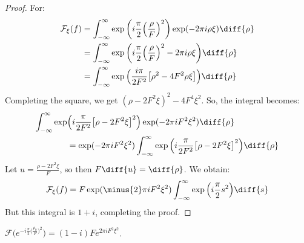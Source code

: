         \begin{proof}
        For:
        \begin{align}
            \mathcal{F}_{\xi}(f)
            &=\int_{-\infty}^{\infty}
                \exp\bigg(
                    i\frac{\pi}{2}
                    \Big(\frac{\rho}{F}\Big)^{2}
                \bigg)
                \exp(-2\pi{i}\rho\xi)\diff{\rho}\\
            &=\int_{-\infty}^{\infty}
                \exp\bigg(
                    i\frac{\pi}{2}\Big(
                        \frac{\rho}{F}
                    \Big)^{2}-2\pi{i}\rho\xi
                \bigg)
                \diff{\rho}\\
            &=\int_{-\infty}^{\infty}
                \exp\Big(
                    \frac{i\pi}{2F^2}
                    \big[\rho^2-4F^2\rho \xi\big]
                \Big)\diff{\rho}
        \end{align}
        Completing the square, we get
        $(\rho-2F^{2}\xi)^{2}-4F^{4}\xi^{2}$.
        So, the integral becomes:
        \begin{equation}
            \begin{split}
                \int_{-\infty}^{\infty}
                \exp&\Big(
                    i\frac{\pi}{2F^2}
                    \big[\rho-2F^{2}\xi\big]^{2}
                \Big)
                \exp(-2\pi{i}F^{2}\xi^{2})\diff{\rho}\\
                &=\exp(-2\pi{i}F^{2}\xi^{2})
                \int_{-\infty}^{\infty}
                \exp\Big(
                    i\frac{\pi}{2F^2}
                    \big[\rho-2F^{2}\xi\big]^{2}
                \Big)\diff{\rho}
            \end{split}
        \end{equation}
        Let $u=\frac{\rho-2F^{2}\xi}{F}$, so then
        $F\diff{u}=\diff{\rho}$. We obtain:
        \begin{equation}
            \mathcal{F}_{\xi}(f)
            =F\exp(\minus{2}\pi{i}F^{2}\xi^{2})
                \int_{-\infty}^{\infty}
                \exp\Big(i\frac{\pi}{2}s^{2}\Big)\diff{s}
        \end{equation}
        But this integral is $1+i$, completing the proof.
        \end{proof}
        \begin{theorem}
        $\mathcal{F}(e^{-i\frac{\pi}{2}\big(\frac{\rho_0}{F}\big)^2}\big) = (1-i)Fe^{2\pi i F^2 \xi^2}$.
        \end{theorem}
